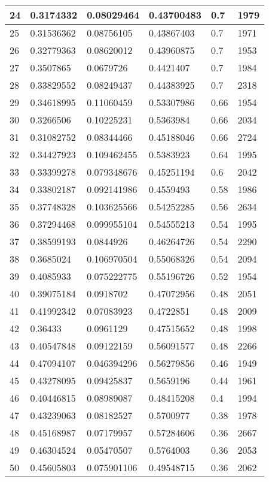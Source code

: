 \begin{longtable}{|l|l|l|l|l|l|}
24 & 0.3174332 & 0.08029464 & 0.43700483 & 0.7 & 1979 \\ \hline 
25 & 0.31536362 & 0.08756105 & 0.43867403 & 0.7 & 1971 \\ \hline 
26 & 0.32779363 & 0.08620012 & 0.43960875 & 0.7 & 1953 \\ \hline 
27 & 0.3507865 & 0.0679726 & 0.4421407 & 0.7 & 1984 \\ \hline 
28 & 0.33829552 & 0.08249437 & 0.44383925 & 0.7 & 2318 \\ \hline 
29 & 0.34618995 & 0.11060459 & 0.53307986 & 0.66 & 1954 \\ \hline 
30 & 0.3266506 & 0.10225231 & 0.5363984 & 0.66 & 2034 \\ \hline 
31 & 0.31082752 & 0.08344466 & 0.45188046 & 0.66 & 2724 \\ \hline 
32 & 0.34427923 & 0.109462455 & 0.5383923 & 0.64 & 1995 \\ \hline 
33 & 0.33399278 & 0.079348676 & 0.45251194 & 0.6 & 2042 \\ \hline 
34 & 0.33802187 & 0.092141986 & 0.4559493 & 0.58 & 1986 \\ \hline 
35 & 0.37748328 & 0.103625566 & 0.54252285 & 0.56 & 2634 \\ \hline 
36 & 0.37294468 & 0.099955104 & 0.54555213 & 0.54 & 1995 \\ \hline 
37 & 0.38599193 & 0.0844926 & 0.46264726 & 0.54 & 2290 \\ \hline 
38 & 0.3685024 & 0.106970504 & 0.55068326 & 0.54 & 2094 \\ \hline 
39 & 0.4085933 & 0.075222775 & 0.55196726 & 0.52 & 1954 \\ \hline 
40 & 0.39075184 & 0.0918702 & 0.47072956 & 0.48 & 2051 \\ \hline 
41 & 0.41992342 & 0.07083923 & 0.4722851 & 0.48 & 2009 \\ \hline 
42 & 0.36433 & 0.0961129 & 0.47515652 & 0.48 & 1998 \\ \hline 
43 & 0.40547848 & 0.09122159 & 0.56091577 & 0.48 & 2266 \\ \hline 
44 & 0.47094107 & 0.046394296 & 0.56279856 & 0.46 & 1949 \\ \hline 
45 & 0.43278095 & 0.09425837 & 0.5659196 & 0.44 & 1961 \\ \hline 
46 & 0.40446815 & 0.08989087 & 0.48415208 & 0.4 & 1994 \\ \hline 
47 & 0.43239063 & 0.08182527 & 0.5700977 & 0.38 & 1978 \\ \hline 
48 & 0.45168987 & 0.07179957 & 0.57284606 & 0.36 & 2667 \\ \hline 
49 & 0.46304524 & 0.05470507 & 0.5764003 & 0.36 & 2053 \\ \hline 
50 & 0.45605803 & 0.075901106 & 0.49548715 & 0.36 & 2062 \\ \hline 
\end{longtable}